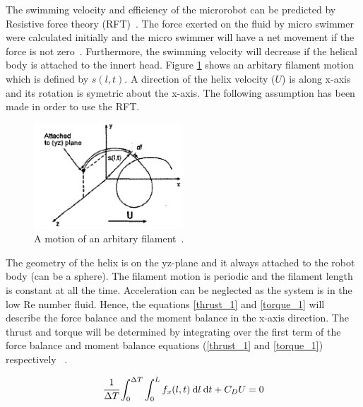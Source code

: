 \documentclass[12pt,a4paper,titlepage]{report}
\begin{document}
The swimming velocity and efficiency of the microrobot can be predicted by Resistive force theory (RFT)~\citep{purcell1997efficiency}. 
The force exerted on the fluid by micro swimmer were calculated initially and the micro swimmer will have a net 
movement if the force is not zero~\citep{Doe:2013:Online}. Furthermore, the swimming velocity will decrease if the helical
body is attached to the innert head. Figure \ref{filament} shows an arbitary filament motion which is defined by $s(l,t)$. 
A direction of the helix velocity ($U$) is along x-axis and its rotation is symetric about the x-axis. 
The following assumption has been made in order to use the RFT. 

\begin{figure}
  \begin{center}
    \includegraphics[width=0.5\textwidth]{filament}
  \caption[A motion of helical segment]{A motion of an arbitary filament~\citep{edd2003biomimetic}.}
  \label{filament}
\end{center}
\end{figure}


The geometry
of the helix is on the yz-plane and it always attached to the robot body (can be a sphere). The 
filament motion is periodic and the filament length is constant at all the time. Acceleration can be neglected as the
system is in the low Re number fluid. Hence, the equations \ref{thrust_1} and \ref{torque_1} will describe the force balance and 
the moment balance in the x-axis direction. The thrust and torque will be determined by integrating over the 
first term of the force balance and moment balance equations (\ref{thrust_1} and \ref{torque_1}) 
 respectively ~\citep{edd2003biomimetic}.





\begin{equation}
  \cfrac {1} {\Delta T} \int_0^{\Delta T} \int_0^L  f_x(l,t)\: \mathrm{d}l \:\mathrm{d}t + C_DU  = 0
\label{thrust_1}
\end{equation}
\end{document}
